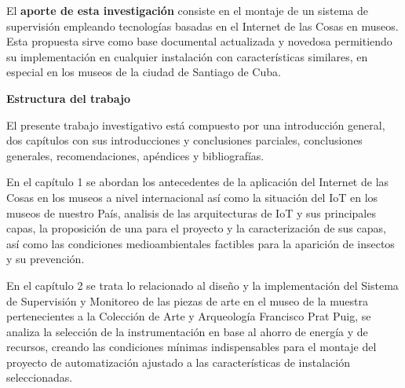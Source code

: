     El \textbf{aporte de esta investigación} consiste en el montaje de un sistema de supervisión empleando tecnologías basadas en el Internet de las Cosas en museos. Esta propuesta sirve como base documental actualizada y novedosa permitiendo su implementación en cualquier instalación con características similares, en especial en los museos de la ciudad de Santiago de Cuba.

    \textbf{Estructura del trabajo}

    El presente trabajo investigativo está compuesto por una introducción general, dos capítulos con sus introducciones y conclusiones parciales, conclusiones generales, recomendaciones, apéndices y bibliografías.

    En el capítulo 1 se abordan los antecedentes de la aplicación del Internet de las Cosas en los museos a nivel internacional así como la situación del IoT en los museos de nuestro País, analisis de las arquitecturas de IoT y sus principales capas, la proposición de una para el proyecto y la caracterización de sus capas, así como las condiciones medioambientales factibles para la aparición de insectos y su prevención.

    En el capítulo 2 se trata lo relacionado al diseño y la implementación del Sistema de Supervisión y Monitoreo de las piezas de arte en el museo de la muestra pertenecientes a la Colección de Arte y Arqueología Francisco Prat Puig, se analiza la selección de la instrumentación en base al ahorro de energía y de recursos, creando las condiciones mínimas indispensables para el montaje del proyecto de automatización ajustado a las características de instalación seleccionadas.
    